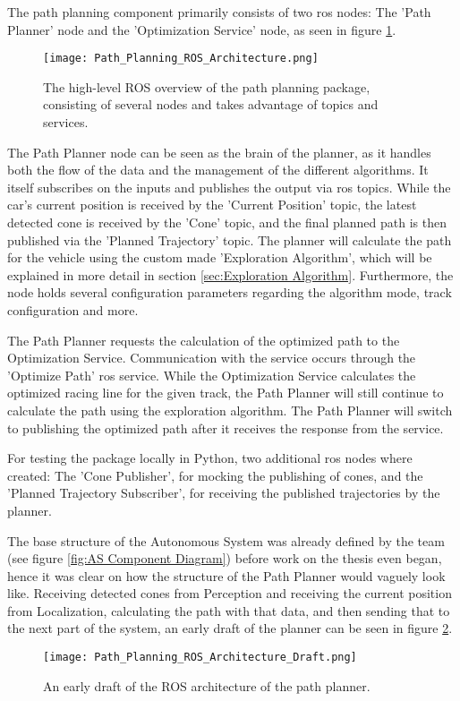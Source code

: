 The path planning component primarily consists of two \acrshort{ros} nodes: The 'Path Planner' node and the 'Optimization Service' node, as seen in figure \ref{fig:Path Planning ROS Architecture}.
\begin{figure}[H]
    \centering
    \texttt{[image: Path\_Planning\_ROS\_Architecture.png]}
    \caption{The high-level ROS overview of the path planning package, consisting of several nodes and takes advantage of topics and services.}
    \label{fig:Path Planning ROS Architecture}
\end{figure}

The Path Planner node can be seen as the brain of the planner, as it handles both the flow of the data and the management of the different algorithms. It itself subscribes on the inputs and publishes the output via \acrshort{ros} topics. While the car's current position is received by the 'Current Position' topic, the latest detected cone is received by the 'Cone' topic, and the final planned path is then published via the 'Planned Trajectory' topic. The planner will calculate the path for the vehicle using the custom made 'Exploration Algorithm', which will be explained in more detail in section \ref{sec:Exploration Algorithm}. Furthermore, the node holds several configuration parameters regarding the algorithm mode, track configuration and more.

The Path Planner requests the calculation of the optimized path to the Optimization Service. Communication with the service occurs through the 'Optimize Path' \acrshort{ros} service. While the Optimization Service calculates the optimized racing line for the given track, the Path Planner will still continue to calculate the path using the exploration algorithm. The Path Planner will switch to publishing the optimized path after it receives the response from the service.

For testing the package locally in Python, two additional \acrshort{ros} nodes where created: The 'Cone Publisher', for mocking the publishing of cones, and the 'Planned Trajectory Subscriber', for receiving the published trajectories by the planner.

The base structure of the Autonomous System was already defined by the team (see figure \ref{fig:AS Component Diagram}) before work on the thesis even began, hence it was clear on how the structure of the Path Planner would vaguely look like. Receiving detected cones from Perception and receiving the current position from Localization, calculating the path with that data, and then sending that to the next part of the system, an early draft of the planner can be seen in figure \ref{fig:Path Planning ROS Architecture Draft}.
\begin{figure}[H]
    \centering
    \texttt{[image: Path\_Planning\_ROS\_Architecture\_Draft.png]}
    \caption{An early draft of the ROS architecture of the path planner.}
    \label{fig:Path Planning ROS Architecture Draft}
\end{figure}

